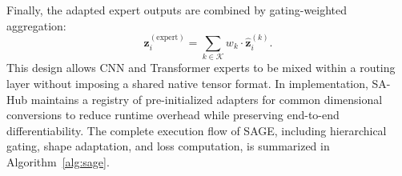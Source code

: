Finally, the adapted expert outputs are combined by gating-weighted aggregation:
\begin{equation}
    \mathbf{z}_i^{(\text{expert})} = \sum_{k \in \mathcal{K}} w_k \cdot \hat{\mathbf{z}}_i^{(k)}.
    \label{eq:expert_output}
\end{equation}
This design allows CNN and Transformer experts to be mixed within a routing layer without imposing a shared native tensor format. In implementation, SA-Hub maintains a registry of pre-initialized adapters for common dimensional conversions to reduce runtime overhead while preserving end-to-end differentiability. The complete execution flow of SAGE, including hierarchical gating, shape adaptation, and loss computation, is summarized in Algorithm~\ref{alg:sage}.